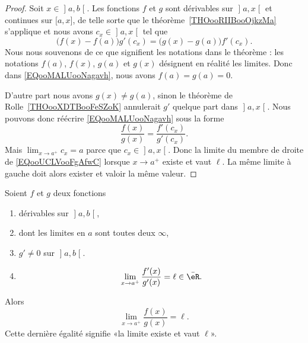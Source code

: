 \begin{proof}
	Soit \( x\in\mathopen] a , b \mathclose[\). Les fonctions \( f\) et \( g\) sont dérivables sur \( \mathopen] a , x \mathclose[\) et continues sur \( \mathopen[ a , x \mathclose]\), de telle sorte que le théorème~\ref{THOooRIIBooOjkzMa} s'applique et nous avons \( c_x\in \mathopen] a , x \mathclose[\) tel que
		\begin{equation}        \label{EQooMALUooNagavh}
			\big( f(x)-f(a) \big)g'(c_x)=\big( g(x)-g(a) \big)f'(c_x).
		\end{equation}
		Nous nous souvenons de ce que signifient les notations dans le théorème : les notations \( f(a)\), \( f(x)\), \( g(a)\) et \( g(x)\) désignent en réalité les limites. Donc dans \eqref{EQooMALUooNagavh}, nous avons \( f(a)=g(a)=0\).

		D'autre part nous avons \( g(x)\neq g(a)\), sinon le théorème de Rolle~\ref{THOooXDTBooFeSZoK} annulerait \( g'\) quelque part dans \( \mathopen] a , x \mathclose[\). Nous pouvons donc réécrire \eqref{EQooMALUooNagavh} sous la forme
		\begin{equation}        \label{EQooUCLVooFgAfwC}
			\frac{ f(x) }{ g(x) }=\frac{ f'(c_x) }{ g'(c_x) }.
		\end{equation}
		Mais \( \lim_{x\to a^+} c_x=a\) parce que \( c_x\in\mathopen] a , x \mathclose[\). Donc la limite du membre de droite de \eqref{EQooUCLVooFgAfwC} lorsque \( x\to a^+\) existe et vaut \( \ell\). La même limite à gauche doit alors exister et valoir la même valeur.
\end{proof}

\begin{proposition}      \label{PROPooTJVCooMeUhIy}
	Soient \( f\) et \( g\) deux fonctions
	\begin{enumerate}
		\item
		      dérivables sur \( \mathopen] a , b \mathclose[\),
		\item
		      dont les limites en \( a\) sont toutes deux \( \infty\),
		\item
		      \( g'\neq 0\) sur \( \mathopen] a , b \mathclose[\).
		\item
		      \begin{equation}        \label{EQooVFYCooMjOGtI}
			      \lim_{x\to a^+} \frac{ f'(x) }{ g'(x) }=\ell\in \bar \eR.
		      \end{equation}
	\end{enumerate}
	Alors
	\begin{equation}
		\lim_{x\to a^+} \frac{ f(x) }{ g(x) }=\ell.
	\end{equation}
	Cette dernière égalité signifie «la limite existe et vaut \( \ell\)».
\end{proposition}

